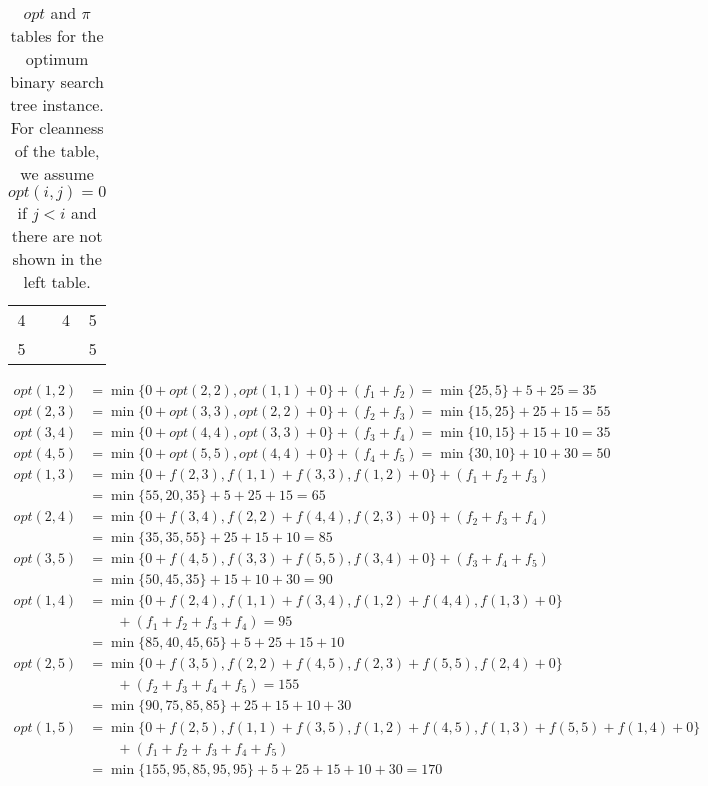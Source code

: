 \begin{example}
\begin{table}[H]
\begin{tabular}{|c|c|c|c|c|c|}
									4& \multicolumn{3}{c|}{} & 4 & 5\\\cline{1-1}\cline{5-6}
									5& \multicolumn{4}{c|}{} & 5 \\\cline{1-1}\cline{6-6}
								\end{tabular}
								\caption{$opt$ and $\pi$ tables for the optimum binary search tree instance. For cleanness of the table, we assume $opt(i, j) = 0$ if $j < i$ and there are not shown in the left table.}
							\end{table}
							\vspace*{-30pt}
							\begin{align*}
								opt(1, 2) &= \min\{0 + opt(2, 2), opt(1, 1) + 0\} + (f_1 + f_2) = \min\{25, 5\} + 5 + 25 = 35\\
								opt(2, 3) &= \min\{0 + opt(3, 3), opt(2, 2) + 0\} + (f_2 + f_3) = \min\{15, 25\} + 25 + 15 = 55\\
								opt(3, 4) &= \min\{0 + opt(4, 4), opt(3, 3) + 0\} + (f_3 + f_4) = \min\{10, 15\} + 15 + 10 = 35\\
								opt(4, 5) &= \min\{0 + opt(5, 5), opt(4, 4) + 0\} + (f_4 + f_5) = \min\{30, 10\} + 10 + 30 = 50\\
								opt(1, 3) &= \min\{0 + f(2, 3), f(1, 1) + f(3, 3), f(1, 2) + 0\} + (f_1 + f_2 + f_3) \\
								&= \min\{55, 20, 35\} + 5 + 25 + 15 = 65 \\
							    opt(2, 4) &= \min\{0 + f(3, 4), f(2, 2) + f(4, 4), f(2, 3) + 0\} + (f_2 + f_3 + f_4) \\ 
							    &= \min\{35, 35, 55\} + 25 + 15 + 10 = 85 \\
								opt(3, 5) &= \min\{0 + f(4, 5), f(3, 3) + f(5, 5), f(3, 4) + 0\} + (f_3 + f_4 + f_5) \\
								&= \min\{50, 45, 35\} + 15 + 10 + 30 = 90 \\
								opt(1, 4) &= \min\{0 + f(2, 4), f(1, 1) + f(3, 4), f(1, 2) + f(4, 4), f(1, 3) + 0\} \\ & \qquad + (f_1 + f_2 + f_3 + f_4) = 95\\
								&= \min\{85, 40, 45, 65\} + 5 + 25 + 15 + 10\\
								opt(2, 5) &= \min\{0 + f(3, 5), f(2, 2) + f(4, 5), f(2, 3) + f(5, 5), f(2, 4) + 0\} \\ & \qquad + (f_2 + f_3 + f_4 + f_5) = 155\\
								&= \min\{90, 75, 85, 85\} + 25 + 15 + 10 + 30 \\
								opt(1, 5) &= \min\{0 + f(2, 5), f(1, 1) + f(3, 5), f(1, 2) + f(4, 5), f(1, 3) + f(5, 5) + f(1, 4) + 0\} \\ & \qquad + (f_1 + f_2 + f_3 + f_4 + f_5) \\
								&= \min\{155, 95, 85, 95, 95\} + 5 + 25 + 15 + 10 + 30 = 170
							\end{align*}
						\end{example}

